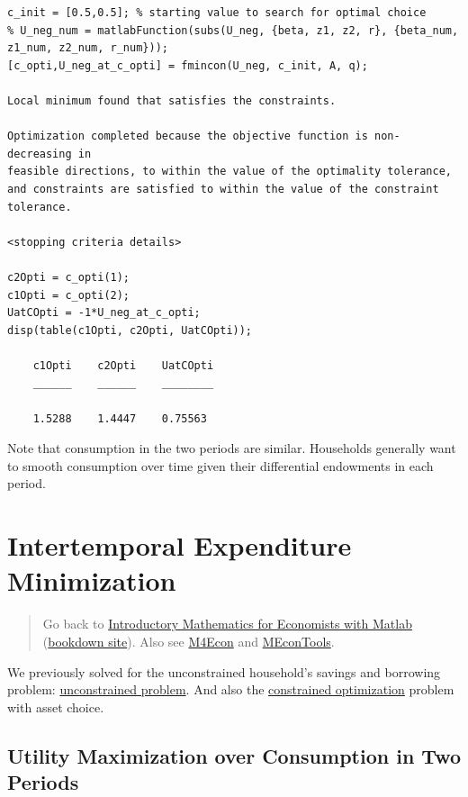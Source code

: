 \documentclass[
]{book}
\begin{document}
\begin{verbatim}
c_init = [0.5,0.5]; % starting value to search for optimal choice
% U_neg_num = matlabFunction(subs(U_neg, {beta, z1, z2, r}, {beta_num, z1_num, z2_num, r_num}));
[c_opti,U_neg_at_c_opti] = fmincon(U_neg, c_init, A, q);

Local minimum found that satisfies the constraints.

Optimization completed because the objective function is non-decreasing in 
feasible directions, to within the value of the optimality tolerance,
and constraints are satisfied to within the value of the constraint tolerance.

<stopping criteria details>

c2Opti = c_opti(1);
c1Opti = c_opti(2);
UatCOpti = -1*U_neg_at_c_opti;
disp(table(c1Opti, c2Opti, UatCOpti));

    c1Opti    c2Opti    UatCOpti
    ______    ______    ________

    1.5288    1.4447    0.75563 
\end{verbatim}

Note that consumption in the two periods are similar. Households
generally want to smooth consumption over time given their differential
endowments in each period.

\hypertarget{intertemporal-expenditure-minimization}{%
\section{Intertemporal Expenditure Minimization}\label{intertemporal-expenditure-minimization}}

\begin{quote}
Go back to \href{https://math4econ.github.io/}{Introductory Mathematics for Economists with Matlab} (\href{https://math4econ.github.io/bookdown}{bookdown site}). Also see \href{http://fanwangecon.github.io/M4Econ}{M4Econ} and \href{https://fanwangecon.github.io/MEconTools/}{MEconTools}.
\end{quote}

We previously solved for the unconstrained household's savings and
borrowing problem: \href{https://math4econ.github.io/derivative_application/K_save_households.html}{unconstrained
problem}.
And also the \href{https://math4econ.github.io/opti_hh_constrained_brsv/household_borrow_constrained.html}{constrained
optimization}
problem with asset choice.

\hypertarget{utility-maximization-over-consumption-in-two-periods-1}{%
\subsection{Utility Maximization over Consumption in Two Periods}\label{utility-maximization-over-consumption-in-two-periods-1}}
\end{document}
